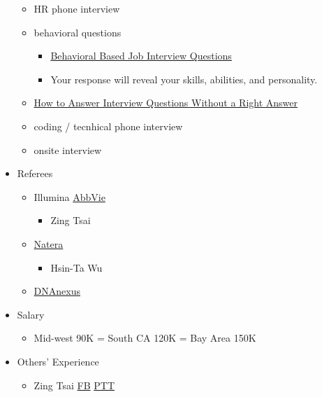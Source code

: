 \documentclass[]{article}
\providecommand{\tightlist}{%
  \setlength{\itemsep}{0pt}\setlength{\parskip}{0pt}}
\begin{document}
\begin{itemize}
  \begin{itemize}
  \tightlist
  \item
    HR phone interview
  \item
    behavioral questions

    \begin{itemize}
    \tightlist
    \item
      \href{https://www.thebalancecareers.com/behavioral-job-interview-questions-2059620}{Behavioral
      Based Job Interview Questions}
    \item
      Your response will reveal your skills, abilities, and personality.
    \end{itemize}
  \item
    \href{https://www.thebalancecareers.com/how-to-answer-interview-questions-without-a-right-answer-2060972}{How
    to Answer Interview Questions Without a Right Answer}
  \item
    coding / tecnhical phone interview
  \item
    onsite interview
  \end{itemize}
\item
  Referees

  \begin{itemize}
  \tightlist
  \item
    Illumina \textbar{} \href{https://www.abbvie.com}{AbbVie}

    \begin{itemize}
    \tightlist
    \item
      Zing Tsai
    \end{itemize}
  \item
    \href{https://www.natera.com}{Natera}

    \begin{itemize}
    \tightlist
    \item
      Hsin-Ta Wu
    \end{itemize}
  \item
    \href{dnanexus\%20careers}{DNAnexus}
  \end{itemize}
\item
  Salary

  \begin{itemize}
  \tightlist
  \item
    Mid-west 90K = South CA 120K = Bay Area 150K
  \end{itemize}
\item
  Others' Experience

  \begin{itemize}
  \tightlist
  \item
    Zing Tsai \textbar{}
    \href{https://www.facebook.com/zing119/posts/10218525777038215?comment_id=10218527415639179\&notif_id=1542554199519979\&notif_t=feed_comment}{FB}
    \textbar{}
    \href{https://www.ptt.cc/bbs/Oversea_Job/M.1542533147.A.38E.html?fbclid=IwAR0UAqswv_7bzH-L_lW1Cj6HP8rj6xbMrWchpKrBFNan1VKHeIZWZEdiYuQ}{PTT}
  \end{itemize}
\end{itemize}
\end{document}
